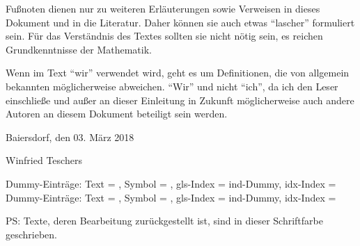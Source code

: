 Fußnoten dienen nur zu weiteren Erläuterungen sowie Verweisen in dieses Dokument und in die Literatur.
Daher können sie auch etwas "`lascher"' formuliert sein.
Für das Verständnis des Textes sollten sie nicht nötig sein, es reichen Grundkenntnisse der Mathematik.

Wenn im Text "`wir"' verwendet wird, geht es um Definitionen, die von allgemein bekannten möglicherweise abweichen.
"`Wir"' und nicht "`ich"', da ich den Leser einschließe und außer an dieser Einleitung in Zukunft möglicherweise auch andere Autoren an diesem Dokument beteiligt sein werden.

\bigskip

Baiersdorf, den 03. März 2018

Winfried Teschers

\iftestFlg
	\color{gray}%
	\bigskip
	Dummy-Einträge: Text = \Dummy, Symbol = \dummy, gls-Index = \gls{ind-Dummy}, idx-Index = \\
	Dummy-Einträge: Text = \Dummy, Symbol = \dummy, gls-Index = \gls{ind-Dummy}, idx-Index = 

	PS: Texte, deren Bearbeitung zurückgestellt ist, sind in dieser Schriftfarbe geschrieben.
	\color{black}%
\else \fi
